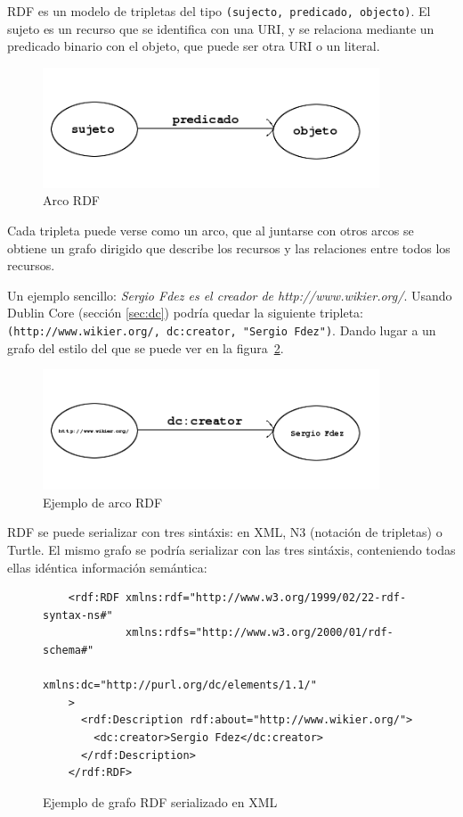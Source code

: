 RDF es un modelo de tripletas del tipo \texttt{(sujecto, predicado, objecto)}. El
sujeto es un recurso que se identifica con una URI, y se relaciona mediante un 
predicado binario con el objeto, que puede ser otra URI o un literal.

\begin{figure}[ht]
	\centering
	\includegraphics[width=10cm]{images/arc.png}
	\caption{Arco RDF}
	\label{fig:rdfTriplet}
\end{figure}

Cada tripleta puede verse como un arco, que al juntarse con otros arcos se obtiene
un grafo dirigido que describe los recursos y las relaciones entre todos los 
recursos.

Un ejemplo sencillo: \textit{Sergio Fdez es el creador de http://www.wikier.org/}. 
Usando Dublin Core (sección \ref{sec:dc}) podría quedar la siguiente tripleta: 
\texttt{(http://www.wikier.org/, dc:creator, "Sergio Fdez")}. Dando lugar a un 
grafo del estilo del que se puede ver en la figura~\ref{fig:rdfTripletExample}.

\begin{figure}[ht]
	\centering
	\includegraphics[width=10cm]{images/arc-example.png}
	\caption{Ejemplo de arco RDF}
	\label{fig:rdfTripletExample}
\end{figure}


RDF se puede serializar con tres sintáxis: en XML, N3 (notación de tripletas)
o Turtle. El mismo grafo se podría serializar con las tres sintáxis, conteniendo 
todas ellas idéntica información semántica:

\begin{figure}[tp]
\begin{verbatim}
	<rdf:RDF xmlns:rdf="http://www.w3.org/1999/02/22-rdf-syntax-ns#"
	         xmlns:rdfs="http://www.w3.org/2000/01/rdf-schema#"
                 xmlns:dc="http://purl.org/dc/elements/1.1/"
	>
	  <rdf:Description rdf:about="http://www.wikier.org/">
	    <dc:creator>Sergio Fdez</dc:creator>	
	  </rdf:Description>
	</rdf:RDF>
\end{verbatim}
	\caption{Ejemplo de grafo RDF serializado en XML}
	\label{fig:ejemplo.rdfxml}
\end{figure}

